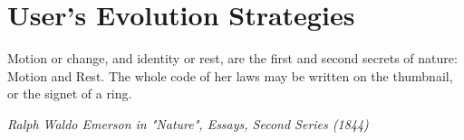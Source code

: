 \chapter{User's Evolution Strategies}
\label{strategies}
\epigraph{Motion or change, and identity or rest, are the first and second secrets of nature: Motion and Rest. 
The whole code of her laws may be written on the thumbnail, or the signet of a ring.}
{\textit{Ralph Waldo Emerson in "Nature", Essays, Second Series (1844)}}







